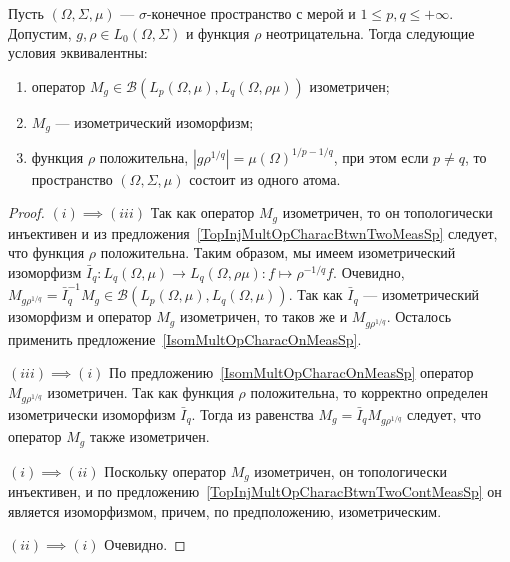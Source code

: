 \begin{proposition}\label{IsomMultOpCharacBtwnTwoContMeasSp} Пусть
$(\Omega,\Sigma,\mu)$ --- $\sigma$-конечное пространство с мерой и $1\leq
p,q\leq +\infty$. Допустим, $g,\rho\in L_0(\Omega,\Sigma)$ и функция $\rho$
неотрицательна. Тогда следующие условия эквивалентны:

\begin{enumerate}[label = (\roman*)]
    \item оператор $M_g\in\mathcal{B}(L_p(\Omega,\mu), L_q(\Omega,\rho \mu))$
    изометричен;

    \item $M_g$ --- изометрический изоморфизм;

    \item функция $\rho$ положительна, 
    $|g  \rho^{1/q}|={\mu(\Omega)}^{1/p-1/q}$, при этом если $p\neq q$, 
    то пространство $(\Omega,\Sigma,\mu)$ состоит из одного атома.
\end{enumerate}
\end{proposition}
\begin{proof} $(i) \implies (iii)$ Так как оператор $M_g$ изометричен, то он
топологически инъективен и из предложения~\ref{TopInjMultOpCharacBtwnTwoMeasSp}
следует, что функция $\rho$ положительна. Таким образом, мы имеем изометрический
изоморфизм $\bar{I}_q:L_q(\Omega,\mu)\to L_q(\Omega,\rho \mu):f\mapsto
\rho^{-1/q}  f$. Очевидно, $M_{g \rho^{1/q}}=\bar{I}_q^{-1}
M_g\in\mathcal{B}(L_p(\Omega,\mu),L_q(\Omega,\mu))$. Так как $\bar{I}_q$ ---
изометрический изоморфизм и оператор $M_g$ изометричен, то таков же и 
$M_{g \rho^{1/q}}$. Осталось применить 
предложение~\ref{IsomMultOpCharacOnMeasSp}.

$(iii) \implies (i)$ По предложению~\ref{IsomMultOpCharacOnMeasSp} оператор
$M_{g \rho^{1/q}}$ изометричен. Так как функция $\rho$ положительна, то
корректно определен изометрически изоморфизм $\bar{I}_q$. Тогда из равенства
$M_g=\bar{I}_q M_{g \rho^{1/q}}$ следует, что оператор $M_g$ также изометричен.

$(i) \implies (ii)$ Поскольку оператор $M_g$ изометричен, он топологически
инъективен, и по предложению~\ref{TopInjMultOpCharacBtwnTwoContMeasSp} он
является изоморфизмом, причем, по предположению, изометрическим.

$(ii) \implies (i)$ Очевидно.
\end{proof}


